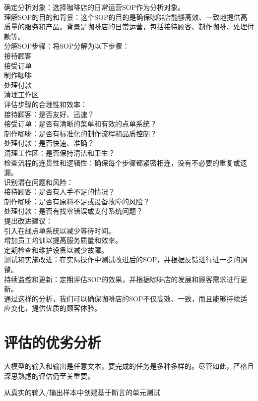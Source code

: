 \documentclass[12pt]{book}
\begin{document}
确定分析对象：选择咖啡店的日常运营SOP作为分析对象。\\
理解SOP的目的和背景：这个SOP的目的是确保咖啡店能够高效、一致地提供高质量的服务和产品。背景是咖啡店的日常运营，包括接待顾客、制作咖啡、处理付款等。\\
分解SOP步骤：将SOP分解为以下步骤：\\
接待顾客\\
接受订单\\
制作咖啡\\
处理付款\\
清理工作区\\
评估步骤的合理性和效率：\\
接待顾客：是否友好、迅速？\\
接受订单：是否有清晰的菜单和有效的点单系统？\\
制作咖啡：是否有标准化的制作流程和品质控制？\\
处理付款：是否快速、准确？\\
清理工作区：是否保持清洁和卫生？\\
检查流程的连贯性和逻辑性：确保每个步骤都紧密相连，没有不必要的重复或遗漏。\\
识别潜在问题和风险：\\
接待顾客：是否有人手不足的情况？\\
制作咖啡：是否有原料不足或设备故障的风险？\\
处理付款：是否有找零错误或支付系统问题？\\
提出改进建议：\\
引入在线点单系统以减少等待时间。\\
增加员工培训以提高服务质量和效率。\\
定期检查和维护设备以减少故障。\\
测试和实施改进：在实际操作中测试改进后的SOP，并根据反馈进行进一步的调整。\\
持续监控和更新：定期评估SOP的效果，并根据咖啡店的发展和顾客需求进行更新。\\
通过这样的分析，我们可以确保咖啡店的SOP不仅高效、一致，而且能够持续适应变化，提供优质的顾客体验。\\

\chapter{评估的优劣分析}
大模型的输入和输出是任意文本，要完成的任务是多种多样的。尽管如此，严格且深思熟虑的评估仍至关重要。

从真实的输入/输出样本中创建基于断言的单元测试
\end{document}

